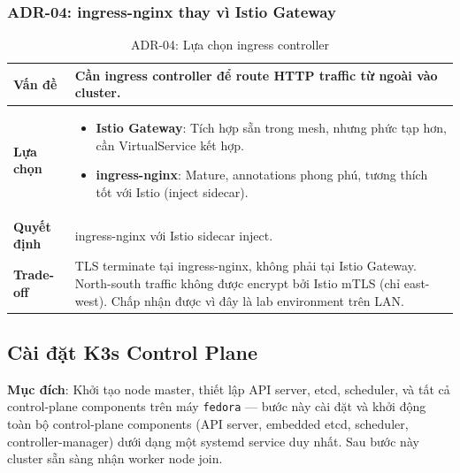 \subsubsection*{ADR-04: ingress-nginx thay vì Istio Gateway}

\begin{table}[H]
\centering
\renewcommand{\arraystretch}{1.3}
\begin{tabular}{|p{3cm}|p{12.5cm}|}
\hline
\textbf{Vấn đề} & Cần ingress controller để route HTTP traffic từ ngoài vào cluster. \\
\hline
\textbf{Lựa chọn} &
\begin{itemize}[noitemsep,topsep=0pt]
  \item \textbf{Istio Gateway}: Tích hợp sẵn trong mesh, nhưng phức tạp hơn, cần VirtualService kết hợp.
  \item \textbf{ingress-nginx}: Mature, annotations phong phú, tương thích tốt với Istio (inject sidecar).
\end{itemize} \\
\hline
\textbf{Quyết định} & ingress-nginx với Istio sidecar inject. \\
\hline
\textbf{Trade-off} & TLS terminate tại ingress-nginx, không phải tại Istio Gateway. North-south traffic không được encrypt bởi Istio mTLS (chỉ east-west). Chấp nhận được vì đây là lab environment trên LAN. \\
\hline
\end{tabular}
\caption{ADR-04: Lựa chọn ingress controller}
\end{table}

\subsection{Cài đặt K3s Control Plane}
\textbf{Mục đích}: Khởi tạo node master, thiết lập API server, etcd, scheduler, và tất cả control-plane components trên máy \texttt{fedora} — bước này cài đặt và khởi động toàn bộ control-plane components (API server, embedded etcd, scheduler, controller-manager) dưới dạng một systemd service duy nhất. Sau bước này cluster sẵn sàng nhận worker node join.

